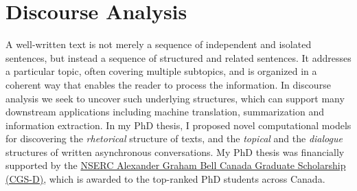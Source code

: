 \documentclass{article} %
\begin{document}



  

 






\section{Discourse Analysis} \label{discourse}

A well-written text is not merely a sequence of independent and isolated sentences, but instead a sequence of structured and related sentences. It addresses a particular topic, often covering multiple subtopics, and is organized in a coherent way that enables the reader to process the information. In discourse analysis we seek to uncover such underlying structures, which can support many downstream applications including machine translation, summarization and information extraction. In my PhD thesis, I proposed novel computational models for discovering the \emph{rhetorical} structure of texts, and the \emph{topical} and the \emph{dialogue} structures of written asynchronous conversations. My PhD thesis was financially supported by the \href{http://www.nserc-crsng.gc.ca/Students-Etudiants/PG-CS/BellandPostgrad-BelletSuperieures_eng.asp}{NSERC Alexander Graham Bell Canada Graduate Scholarship (CGS-D)}, which is awarded to the top-ranked PhD students across Canada. 


\end{document}
